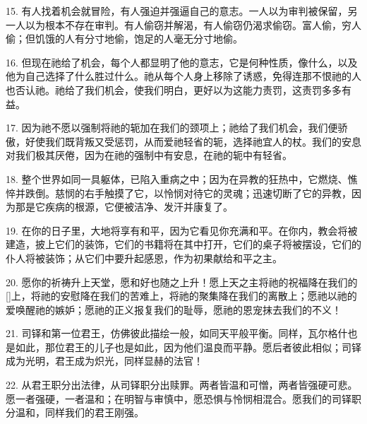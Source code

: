 15. 有人找着机会就冒险，有人强迫并强逼自己的意志。一人以为审判被保留，另一人以为根本不存在审判。有人偷窃并解渴，有人偷窃仍渴求偷窃。富人偷，穷人偷；但饥饿的人有分寸地偷，饱足的人毫无分寸地偷。\par

16. 但现在祂给了机会，每个人都显明了他的意志，它是何种性质，像什么，以及他为自己选择了什么胜过什么。祂从每个人身上移除了诱惑，免得连那不恨祂的人也否认祂。祂给了我们机会，使我们明白，更好以为这能力责罚，这责罚多多有益。\par

17. 因为祂不愿以强制将祂的轭加在我们的颈项上；祂给了我们机会，我们便骄傲，好使我们既背叛又受惩罚，从而爱祂轻省的轭，选择祂宜人的杖。我们的安息对我们极其厌倦，因为在祂的强制中有安息，在祂的轭中有轻省。\par

18. 整个世界如同一具躯体，已陷入重病之中；因为在异教的狂热中，它燃烧、憔悴并跌倒。慈悯的右手触摸了它，以怜悯对待它的灵魂；迅速切断了它的异教，因为那是它疾病的根源，它便被洁净、发汗并康复了。\par

19. 在你的日子里，大地将享有和平，因为它看见你充满和平。在你内，教会将被建造，披上它们的装饰，它们的书籍将在其中打开，它们的桌子将被摆设，它们的仆人将被装饰；从它们中要升起感恩，作为初果献给和平之主。\par

20. 愿你的祈祷升上天堂，愿和好也随之上升！愿上天之主将祂的祝福降在我们的[]上，将祂的安慰降在我们的苦难上，将祂的聚集降在我们的离散上；愿祂以祂的爱唤醒祂的嫉妒；愿祂的正义报复我们的耻辱，愿祂的恩宠抹去我们的不义！\par

21. 司铎和第一位君王，仿佛彼此描绘一般，如同天平般平衡。同样，瓦尔格什也是如此，那位君王的儿子也是如此，因为他们温良而平静。愿后者彼此相似；司铎成为光明，君王成为炽光，同样显赫的法官！\par

22. 从君王职分出法律，从司铎职分出赎罪。两者皆温和可憎，两者皆强硬可悲。愿一者强硬，一者温和；在明智与审慎中，愿恐惧与怜悯相混合。愿我们的司铎职分温和，同样我们的君王刚强。\par

